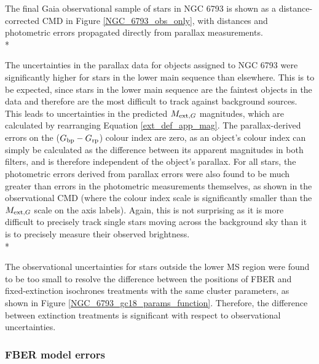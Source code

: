 \documentclass[12pt, a4paper]{report}
\begin{document}
The final Gaia observational sample of stars in NGC 6793 is shown as a distance-corrected CMD in Figure \ref{NGC_6793_obs_only}, with distances and photometric errors propagated directly from parallax measurements.\\*

The uncertainties in the parallax data for objects assigned to NGC 6793 were significantly higher for stars in the lower main sequence than elsewhere. This is to be expected, since stars in the lower main sequence are the faintest objects in the data and therefore are the most difficult to track against background sources.  This leads to uncertainties in the predicted $M_{\textnormal{ext},G}$ magnitudes, which are calculated by rearranging Equation \ref{ext_def_app_mag}. The parallax-derived errors on the ($G_{\textnormal{bp}}-G_{\textnormal{rp}}$) colour index are zero, as an object's colour index can simply be calculated as the difference between its apparent magnitudes in both filters, and is therefore independent of the object's parallax. For all stars, the photometric errors derived from parallax errors were also found to be much greater than errors in the photometric measurements themselves, as shown in the observational CMD (where the colour index scale is significantly smaller than the $M_{\textnormal{ext},G}$ scale on the axis labels). Again, this is not surprising as it is more difficult to precisely track single stars moving across the background sky than it is to precisely measure their observed brightness.\\*

The observational uncertainties for stars outside the lower MS region were found to be too small to resolve the difference between the positions of FBER and fixed-extinction isochrones treatments with the same cluster parameters, as shown in Figure \ref{NGC_6793_gc18_params_function}. Therefore, the difference between extinction treatments is significant with respect to observational uncertainties.

\subsubsection{FBER model errors}
\end{document}
